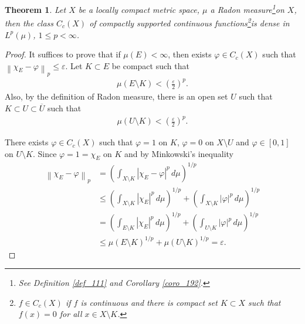 \documentclass[11pt]{book}
\newtheorem{theorem}{Theorem}[chapter]
\theoremstyle{definition}
\numberwithin{equation}{chapter}
\begin{document}
\begin{theorem}\label{theorem_45}
Let $X$ be a locally compact metric space, $\mu$ a Radon measure\footnote{See Definition \ref{def_111} and Corollary \ref{coro_192}.}on $X$, then the class $C_c(X)$ of compactly supported continuous functions\footnote{$f \in C_c(X)$ if $f$ is continuous and there is compact set $K \subset X$ such that $f(x) = 0$ for all $x \in X\setminus K$.}is dense in $L^p(\mu)$, $1 \leq p < \infty$.
\end{theorem}
\begin{proof}
It suffices to prove that if $\mu(E) < \infty$, then exists $\varphi \in C_c(X)$ such that $\left\|\chi_E - \varphi\right\|_p \leq \varepsilon$. Let $K \subset E$ be compact such that 
\begin{align*}
    \mu(E \setminus K) < \left(\frac{\varepsilon}{2}\right)^p.
\end{align*}
Also, by the definition of Radon measure, there is an open set $U$ such that $K \subset U \subset \overline{U}$ such that
\begin{align*}
    \mu(U \setminus K) < \left(\frac{\varepsilon}{2}\right)^p.
\end{align*}

There exists $\varphi \in C_c(X)$ such that $\varphi = 1$ on $K$, $\varphi = 0$ on $X \setminus U$ and $\varphi \in [0,1]$ on $U \setminus K$. Since $\varphi = 1 = \chi_E$ on $K$ and by Minkowski's inequality
\begin{align*}
    \left\|\chi_E - \varphi\right\|_p & = \left(\int_{X \setminus K} \left|\chi_E - \varphi\right|^p \,d\mu\right)^{1/p} \\
    & \leq \left(\int_{X \setminus K} \left|\chi_E\right|^p \,d\mu\right)^{1/p} + \left(\int_{X \setminus K} \left|\varphi\right|^p \,d\mu\right)^{1/p} \\
    & = \left(\int_{E \setminus K} \left|\chi_E\right|^p \,d\mu\right)^{1/p} + \left(\int_{U \setminus K} \left|\varphi\right|^p \,d\mu\right)^{1/p} \\
    & \leq \mu(E \setminus K)^{1/p} + \mu(U \setminus K)^{1/p} = \varepsilon.
\end{align*}
\end{proof}

\medskip
\end{document}
